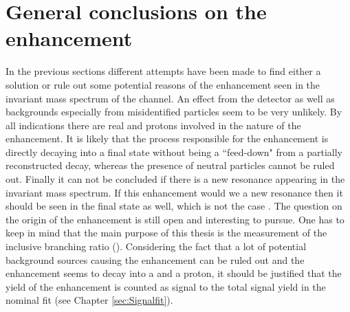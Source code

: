 \section{General conclusions on the enhancement}
In the previous sections different attempts have been made to find either a solution or rule out some potential reasons of the enhancement seen in the invariant \Dz\proton mass spectrum of the \LbToDpmunuX channel.
An effect from the detector as well as backgrounds especially from misidentified particles seem to be very unlikely.
By all indications there are real \Dz and protons involved in the nature of the enhancement.
It is likely that the process responsible for the enhancement is directly decaying into a \Dz\proton final state without being a ``feed-down" from a partially reconstructed decay, whereas the presence of neutral particles cannot be ruled out.
Finally it can not be concluded if there is a new resonance appearing in the invariant \Dz\proton mass spectrum.
If this enhancement would we a new \Lc resonance then it should be seen in the \Lc\pip\pim final state as well, which is not the case \cite{PDG}.
The question on the origin of the enhancement is still open and interesting to pursue.
One has to keep in mind that the main purpose of this thesis is the measurement of the inclusive branching ratio \BR(\LbToDpmunuX). 
Considering the fact that a lot of potential background sources causing the enhancement can be ruled out and the enhancement seems to decay into a \Dz and a proton, it should be justified that the yield of the enhancement is counted as signal to
the total signal yield \NDp in the nominal fit (see Chapter \ref{sec:Signalfit}). 
